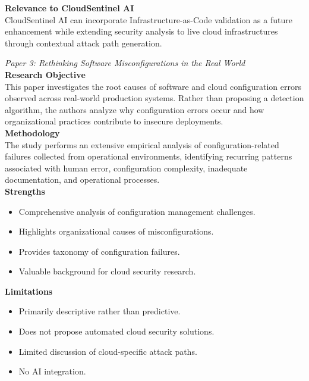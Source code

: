 \textbf{Relevance to CloudSentinel AI}\\
CloudSentinel AI can incorporate Infrastructure-as-Code validation as a future enhancement while extending security analysis to live cloud infrastructures through contextual attack path generation.

\emph{Paper 3: Rethinking Software Misconfigurations in the Real World}\\
\textbf{Research Objective}\\
This paper investigates the root causes of software and cloud configuration errors observed across real-world production systems. Rather than proposing a detection algorithm, the authors analyze why configuration errors occur and how organizational practices contribute to insecure deployments.\\
\textbf{Methodology}\\
The study performs an extensive empirical analysis of configuration-related failures collected from operational environments, identifying recurring patterns associated with human error, configuration complexity, inadequate documentation, and operational processes.\\
\textbf{Strengths}

\begin{itemize}
\tightlist
\item
  Comprehensive analysis of configuration management challenges.\\
\item
  Highlights organizational causes of misconfigurations.\\
\item
  Provides taxonomy of configuration failures.\\
\item
  Valuable background for cloud security research.
\end{itemize}

\textbf{Limitations}

\begin{itemize}
\tightlist
\item
  Primarily descriptive rather than predictive.\\
\item
  Does not propose automated cloud security solutions.\\
\item
  Limited discussion of cloud-specific attack paths.\\
\item
  No AI integration.
\end{itemize}

